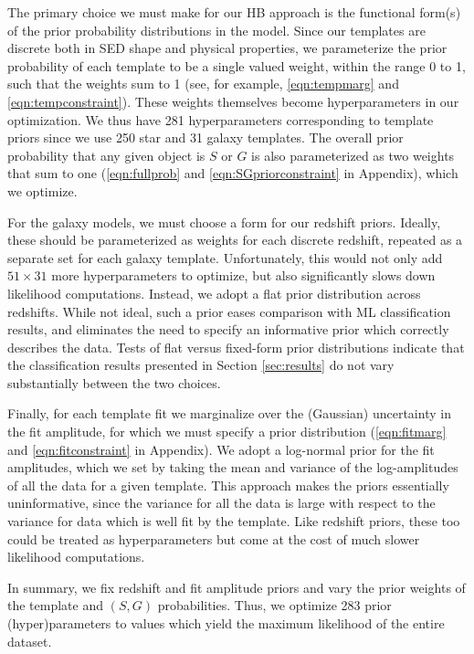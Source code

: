 \documentclass[12pt,preprint]{aastex}
\begin{document}
The primary choice we must make for our HB approach is the functional
form(s) of the prior probability distributions in the model.  Since
our templates are discrete both in SED shape and physical properties,
we parameterize the prior probability of each template to be a single
valued weight, within the range 0 to 1, such that the weights sum to
1 (see, for example, \ref{eqn:tempmarg} and \ref{eqn:tempconstraint}).  
These weights themselves become hyperparameters in our
optimization.  We thus have 281 hyperparameters corresponding to
template priors since we use 250 star and 31 galaxy templates.  The
overall prior probability that any given object is $S$ or $G$ is also
parameterized as two weights that sum to one (\ref{eqn:fullprob} and 
\ref{eqn:SGpriorconstraint} in Appendix), which we optimize.

For the galaxy models, we must choose a form for our redshift priors.  Ideally,
these should be parameterized as weights for each discrete redshift,
repeated as a separate set for each galaxy template.  Unfortunately,
this would not only add $51\times31$ more hyperparameters to optimize,
but also significantly slows down likelihood computations.  Instead,
we adopt a flat prior distribution across redshifts.  While not ideal,
such a prior eases comparison with ML classification results, and
eliminates the need to specify an informative prior which correctly
describes the data.  Tests of flat versus fixed-form prior
distributions indicate that the classification results presented in
Section \ref{sec:results} do not vary substantially between the two
choices.  

Finally, for each template fit we marginalize over the (Gaussian) uncertainty 
in the fit amplitude, for which we must specify a prior distribution 
(\ref{eqn:fitmarg} and \ref{eqn:fitconstraint} in Appendix).  We adopt a log-normal 
prior for the fit amplitudes, which we set by taking the mean and variance 
of the log-amplitudes of all the data for a given template.  This approach makes 
the priors essentially uninformative, since the variance for all the data is 
large with respect to the variance for data which is well fit by the template.
Like redshift priors, these too could be treated as hyperparameters but come 
at the cost of much slower likelihood computations.  

In summary, we fix redshift and fit amplitude priors and vary the prior weights 
of the template and $(S,G)$ probabilities.  Thus, we optimize 283 prior
(hyper)parameters to values which yield the maximum likelihood of the entire 
dataset.
\end{document}
